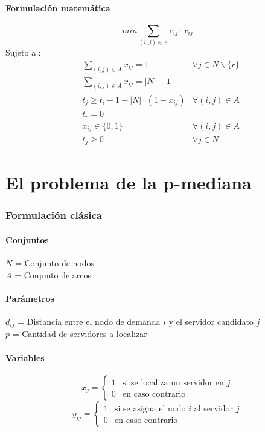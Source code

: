 \documentclass{article}
\numberwithin{equation}{section}
\begin{document}
\subsection{Formulación matemática}
\begin{equation}
min \sum_{(i,j) \in A} c_{ij} \cdot x_{ij}
\end{equation}
Sujeto a : \begin{align}
& \sum_{(i,j) \in A} x_{ij} = 1 &\forall j \in N \backslash \{r\}\\
& \sum_{(i,j) \in A} x_{ij} = |N| - 1\\
& t_{j} \geq t_{i} + 1 - |N| \cdot (1 - x_{ij}) &\forall (i,j) \in A\\
& t_{r} = 0\\
& x_{ij} \in \{0,1\} &\forall (i,j) \in A\\
& t_{j} \geq 0 &\forall j \in N
\end{align}

\newpage
\part{El problema de la p-mediana}
\section{Formulación clásica}
\subsection{Conjuntos}
$N$ = Conjunto de nodos\\
$A$ = Conjunto de arcos
\subsection{Parámetros}
$d_{ij}$ = Distancia entre el nodo de demanda $i$ y el servidor candidato $j$\\
$p$ = Cantidad de servidores a localizar
\subsection{Variables}
\begin{center}
\[x_{j}={\begin{cases}1&{\mbox{si se localiza un servidor en $j$}}\\0&{\mbox{en caso contrario}}\end{cases}}
\]
\[y_{ij}={\begin{cases}1&{\mbox{si se asigna el nodo $i$ al servidor $j$}}\\0&{\mbox{en caso contrario}}\end{cases}}
\]
\end{center}
\end{document}
